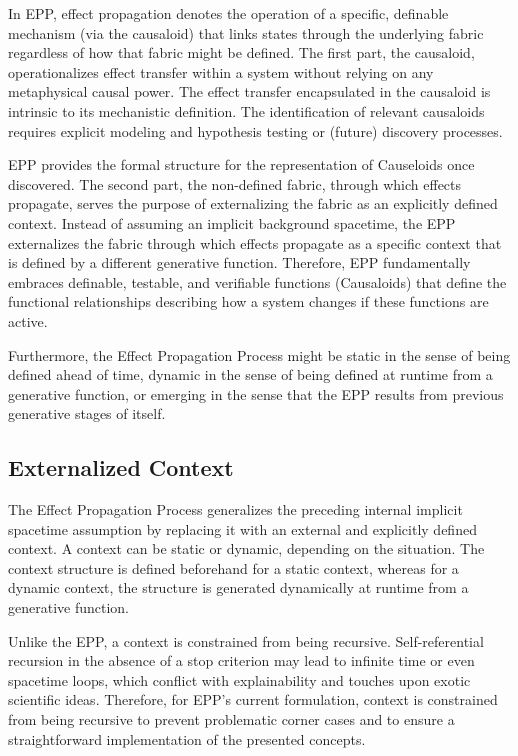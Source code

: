 \documentclass{article}
\begin{document}
In EPP, effect propagation denotes the operation of a specific, definable mechanism (via the causaloid) that links states through the underlying fabric regardless of how that fabric might be defined. The first part, the causaloid, operationalizes effect transfer within a system without relying on any metaphysical causal power. The effect transfer encapsulated in the causaloid is intrinsic to its mechanistic definition. The identification of relevant causaloids requires explicit modeling and hypothesis testing or (future) discovery processes. 

EPP provides the formal structure for the representation of Causeloids once discovered. The second part, the non-defined fabric, through which effects propagate, serves the purpose of externalizing the fabric as an explicitly defined context. Instead of assuming an implicit background spacetime, the EPP externalizes the fabric through which effects propagate as a specific context that is defined by a different generative function. Therefore, EPP fundamentally embraces definable, testable, and verifiable functions (Causaloids) that define the functional relationships describing how a system changes if these functions are active.

Furthermore, the Effect Propagation Process might be static in the sense of being defined ahead of time, dynamic in the sense of being defined at runtime from a generative function, or emerging in the sense that the EPP results from previous generative stages of itself.

\newpage

\subsection{Externalized Context}
\label{subsec:Externalized_Context}

The Effect Propagation Process generalizes the preceding internal implicit spacetime assumption by replacing it with an external and explicitly defined context.
A context can be static or dynamic, depending on the situation. The context structure is defined beforehand for a static context, whereas for a dynamic context, the structure is generated dynamically at runtime from a generative function.

Unlike the EPP, a context is constrained from being recursive. Self-referential recursion in the absence of a stop criterion may lead to infinite time or even spacetime loops, which conflict with explainability and touches upon exotic scientific ideas. Therefore, for EPP's current formulation, context is constrained from being recursive to prevent problematic corner cases and to ensure a straightforward implementation of the presented concepts.
\end{document}
